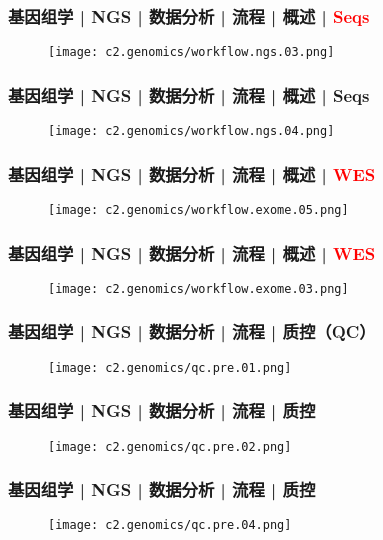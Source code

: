\begin{frame}
  \frametitle{基因组学 | NGS | 数据分析 | 流程 | 概述 | \textcolor{red}{Seqs}}
  \begin{figure}
    \centering
    \texttt{[image: c2.genomics/workflow.ngs.03.png]}
  \end{figure}
\end{frame}

\begin{frame}
  \frametitle{基因组学 | NGS | 数据分析 | 流程 | 概述 | Seqs}
  \begin{figure}
    \centering
    \texttt{[image: c2.genomics/workflow.ngs.04.png]}
  \end{figure}
\end{frame}

\begin{frame}
  \frametitle{基因组学 | NGS | 数据分析 | 流程 | 概述 | \textcolor{red}{WES}}
  \begin{figure}
    \centering
    \texttt{[image: c2.genomics/workflow.exome.05.png]}
  \end{figure}
\end{frame}

\begin{frame}
  \frametitle{基因组学 | NGS | 数据分析 | 流程 | 概述 | \textcolor{red}{WES}}
  \begin{figure}
    \centering
    \texttt{[image: c2.genomics/workflow.exome.03.png]}
  \end{figure}
\end{frame}

\begin{frame}
  \frametitle{基因组学 | NGS | 数据分析 | 流程 | 质控（QC）}
  \begin{figure}
    \centering
    \texttt{[image: c2.genomics/qc.pre.01.png]}
  \end{figure}
\end{frame}

\begin{frame}
  \frametitle{基因组学 | NGS | 数据分析 | 流程 | 质控}
  \begin{figure}
    \centering
    \texttt{[image: c2.genomics/qc.pre.02.png]}
  \end{figure}
\end{frame}

\begin{frame}
  \frametitle{基因组学 | NGS | 数据分析 | 流程 | 质控}
  \begin{figure}
    \centering
    \texttt{[image: c2.genomics/qc.pre.04.png]}
  \end{figure}
\end{frame}

